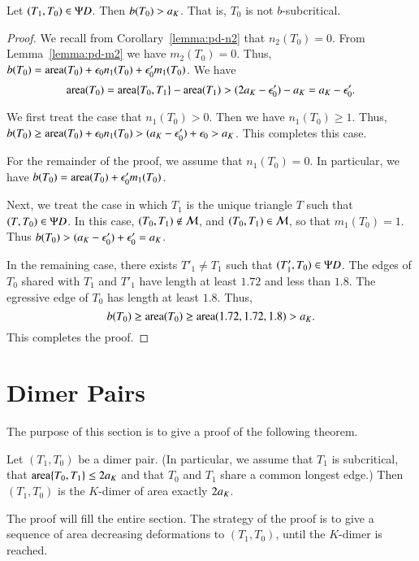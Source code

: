 \begin{lemma}  Let $(T_1,T_0)\in\Psi D$.  Then $b(T_0) > a_K$.  That is, $T_0$ is not $b$-subcritical.
\end{lemma}

\begin{proof}
We recall from Corollary~\ref{lemma:pd-n2} that $n_2(T_0)=0$.  From Lemma~\ref{lemma:pd-m2} we
have $m_2(T_0)=0$.  Thus, $b(T_0) = {\operatorname{area}}(T_0) + \epsilon_0 n_1(T_0) + \epsilon_0' m_1(T_0)$.
We have
\[
{\operatorname{area}}(T_0) = {\operatorname{area}}\{T_0,T_1\} - {\operatorname{area}}(T_1) > (2a_K-\epsilon_0') -a_K = a_K - \epsilon_0'.
\]

We first treat the case that $n_1(T_0)>0$.  Then we have $n_1(T_0)\ge 1$.
Thus, $b(T_0) \ge {\operatorname{area}}(T_0) + \epsilon_0 n_1(T_0) > (a_K - \epsilon_0') + \epsilon_0 > a_K$.
This completes this case.  

For the remainder of the proof, we assume that $n_1(T_0)=0$.  In particular, we have
$b(T_0) = {\operatorname{area}}(T_0) + \epsilon_0' m_1(T_0)$.

Next, we treat the case in which $T_1$ is the unique triangle $T$ such that $(T,T_0)\in\Psi D$.
In this case, $(T_0,T_1)\not\in\mathcal M$, and $(T_0,T_1)\in\mathcal M$, so that $m_1(T_0)=1$.  Thus
$b(T_0) > (a_K-\epsilon_0') + \epsilon_0' = a_K$.

In the remaining case, there exists $T'_1\ne T_1$ such that $(T'_1,T_0)\in\Psi D$.  The edges of
$T_0$ shared with $T_1$ and $T'_1$ have length at least $1.72$ and less than $1.8$.  The
egressive edge of $T_0$ has length at least $1.8$.  Thus,
\[
b(T_0) \ge {\operatorname{area}} (T_0) \ge {\operatorname{area}}(1.72,1.72,1.8) > a_K.
\]
This completes the proof.
\end{proof}


\section{Dimer Pairs}

The purpose of this section is to give a proof of the following theorem.  


\begin{theorem}
Let $(T_1,T_0)$ be a dimer pair.  (In particular, we assume that $T_1$ is subcritical,
that ${\operatorname{area}}\{T_0,T_1\}\le 2a_K$ and that $T_0$ and $T_1$ share a common longest edge.)
Then $(T_1,T_0)$ is the $K$-dimer of area exactly $2a_K$.
\end{theorem}

The proof will fill the entire section.
 The strategy
of the proof is to give a sequence of area decreasing deformations to $(T_1,T_0)$,
until the $K$-dimer is reached.

